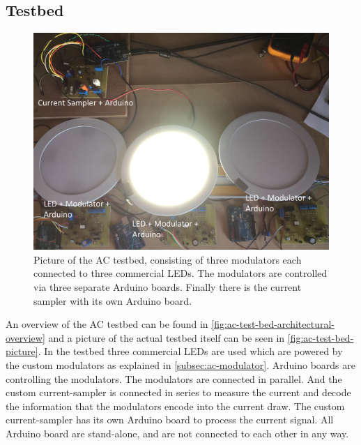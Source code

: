 

\subsection{Testbed}
\label{subsec:ac-testbed}

\begin{figure}[ht]
	\centering
	\includegraphics[angle=0,width=\textwidth,height=.9\textheight,keepaspectratio]{chapters/hardware-chapters/AC/ac-test-bed/ac-test-bed-picture}
	\caption{Picture of the AC testbed, consisting of three modulators each connected to three commercial LEDs. The modulators are controlled via three separate Arduino boards. Finally there is the current sampler with its own Arduino board.}
	\label{fig:ac-test-bed-picture}
\end{figure}



An overview of the AC testbed can be found in \autoref{fig:ac-test-bed-architectural-overview} and a picture of the actual testbed itself can be seen in \autoref{fig:ac-test-bed-picture}.
In the testbed three commercial LEDs are used which are powered by the custom modulators as explained in \autoref{subsec:ac-modulator}.
Arduino boards are controlling the modulators.
The modulators are connected in parallel. 
And the custom current-sampler is connected in series to measure the current and decode the information that the modulators encode into the current draw.
The custom current-sampler has its own Arduino board to process the current signal.
All Arduino board are stand-alone, and are not connected to each other in any way.


